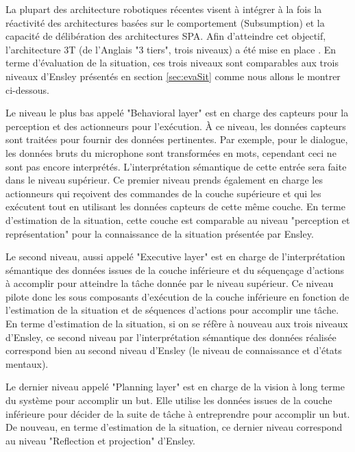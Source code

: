 \documentclass[a4paper,11pt,twoside]{StyleThese}
\begin{document}
La plupart des architecture robotiques récentes visent à intégrer à la fois la réactivité des architectures basées sur le comportement (Subsumption) et la capacité de délibération des architectures SPA.
Afin d'atteindre cet objectif, l'architecture 3T (de l'Anglais "3 tiers", trois niveaux) a été mise en place \cite{bonasso1995experiences}. En terme d'évaluation de la situation, ces trois niveaux sont comparables aux trois niveaux d'Ensley présentés en section \ref{sec:evaSit} comme nous allons le montrer ci-dessous.

Le niveau le plus bas appelé "Behavioral layer" est en charge des capteurs pour la perception et des actionneurs pour l'exécution.
À ce niveau, les données capteurs sont traitées pour fournir des données pertinentes. Par exemple, pour le dialogue, les données bruts du microphone sont transformées en mots, cependant ceci ne sont pas encore interprétés. L'interprétation sémantique de cette entrée sera faite dans le niveau supérieur.
Ce premier niveau prends également en charge les actionneurs qui reçoivent des commandes de la couche supérieure et qui les exécutent tout en utilisant les données capteurs de cette même couche.
En terme d'estimation de la situation, cette couche est comparable au niveau "perception et représentation" pour la connaissance de la situation présentée par Ensley.

Le second niveau, aussi appelé "Executive layer" est en charge de l'interprétation sémantique des données issues de la couche inférieure et du séquençage d'actions à accomplir pour atteindre la tâche donnée par le niveau supérieur. Ce niveau pilote donc les sous composants d'exécution de la couche inférieure en fonction de l'estimation de la situation et de séquences d'actions pour accomplir une tâche. En terme d'estimation de la situation, si on se réfère à nouveau aux trois niveaux d'Ensley, ce second niveau par l'interprétation sémantique des données réalisée correspond bien au second niveau d'Ensley (le niveau de connaissance et d'états mentaux).

Le dernier niveau appelé "Planning layer" est en charge de la vision à long terme du système pour accomplir un but. Elle utilise les données issues de la couche inférieure pour décider de la suite de tâche à entreprendre pour accomplir un but. De nouveau, en terme d'estimation de la situation, ce dernier niveau correspond au niveau "Reflection et projection" d'Ensley.
\end{document}
